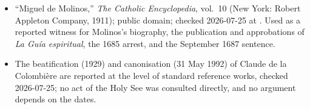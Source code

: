 {\fontsize{8.6}{9.6}\selectfont
\begin{itemize}[itemsep=0pt,parsep=0pt,topsep=0.05em]
\item ``Miguel de Molinos,'' \emph{The Catholic Encyclopedia}, vol.~10 (New York: Robert Appleton Company, 1911); public domain; checked 2026-07-25 at . Used as a reported witness for Molinos's biography, the publication and approbations of \emph{La Guía espiritual}, the 1685 arrest, and the September 1687 sentence.
\item The beatification (1929) and canonisation (31 May 1992) of Claude de la Colombière are reported at the level of standard reference works, checked 2026-07-25; no act of the Holy See was consulted directly, and no argument depends on the dates.
\end{itemize}}

\endgroup
